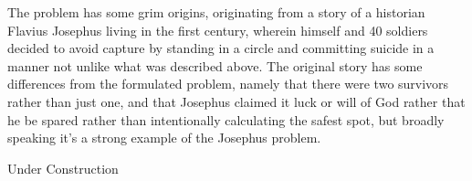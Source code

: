 The problem has some grim origins, originating from a story of a historian Flavius Josephus living in the first century, wherein himself and 40 soldiers decided to avoid capture by standing in a circle and committing suicide in a manner not unlike what was described above. The original story has some differences from the formulated problem, namely that there were two survivors rather than just one, and that Josephus claimed it luck or will of God rather that he be spared rather than intentionally calculating the safest spot, but broadly speaking it's a strong example of the Josephus problem.



Under Construction